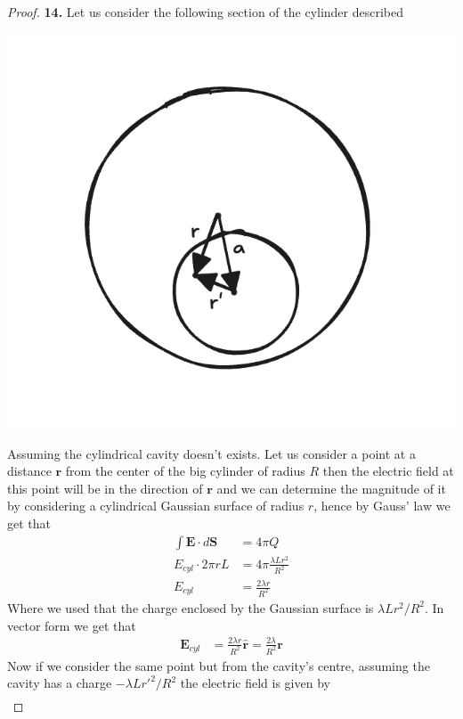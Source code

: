 \documentclass[11pt]{article}
\newcommand{\hatr}{\bm{\hat{r}}}
\theoremstyle{definition}
\begin{document}
\begin{proof}{\textbf{14.}}
    Let us consider the following section of the cylinder described
    \begin{center}
        \includegraphics[scale=0.3]{ch2-14.png}
    \end{center}
    Assuming the cylindrical cavity doesn't exists.
    Let us consider a point at a distance $\bm r$ from the center of the big
    cylinder of radius $R$ then the electric field at this point will be in the
    direction of $\bm{r}$ and we can determine the magnitude of it by
    considering a cylindrical Gaussian surface of radius $r$,
    hence by Gauss' law we get that
    \begin{align*}
        \int \bm{E} \cdot d\bm{S} &= 4\pi Q\\
        E_{cyl} \cdot 2\pi r L&= 4\pi\frac{\lambda L r^2}{R^2}\\
        E_{cyl} &= \frac{2\lambda r}{R^2}
    \end{align*}
    Where we used that the charge enclosed by the Gaussian surface is
    $\lambda L r^2/R^2$. In vector form we get that
    \begin{align*}
        \bm E_{cyl} &= \frac{2\lambda r}{R^2} \hatr = \frac{2\lambda}{R^2} \bm{r}
    \end{align*}
    Now if we consider the same point but from the cavity's centre,
    assuming the cavity has a charge $-\lambda L r'^2/R^2$ the electric field
    is given by
    \begin{align*}

\end{align*}
\end{proof}
\end{document}
